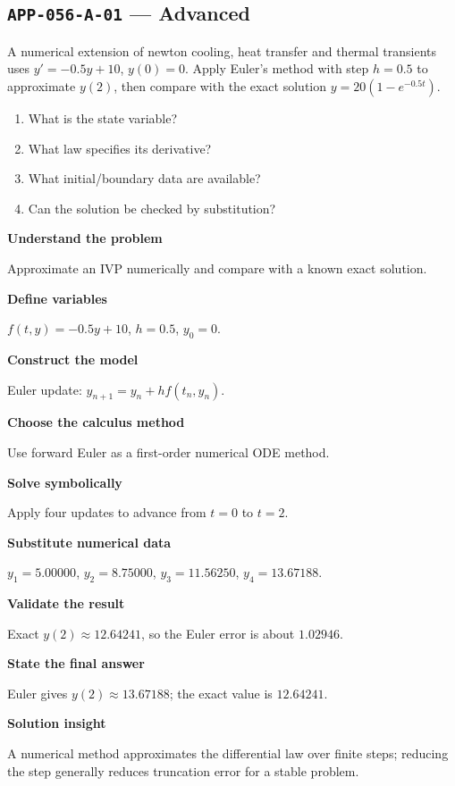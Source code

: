 \documentclass[11pt]{book}
\newcommand{\pid}[1]{\texttt{#1}}
\begin{document}
\subsection*{\pid{APP-056-A-01} — Advanced}
\begin{problembox}
A numerical extension of newton cooling, heat transfer and thermal transients uses $y'=-0.5y+10$, $y(0)=0$. Apply Euler's method with step $h=0.5$ to approximate $y(2)$, then compare with the exact solution $y=20(1-e^{-0.5t})$.
\end{problembox}
\begin{promptbox}\begin{enumerate}
\item What is the state variable?
\item What law specifies its derivative?
\item What initial/boundary data are available?
\item Can the solution be checked by substitution?
\end{enumerate}\end{promptbox}
\begin{solutionbox}
\textbf{Understand the problem}\par Approximate an IVP numerically and compare with a known exact solution.\par\medskip
\textbf{Define variables}\par $f(t,y)=-0.5y+10$, $h=0.5$, $y_0=0$.\par\medskip
\textbf{Construct the model}\par Euler update: $y_{n+1}=y_n+h f(t_n,y_n)$.\par\medskip
\textbf{Choose the calculus method}\par Use forward Euler as a first-order numerical ODE method.\par\medskip
\textbf{Solve symbolically}\par Apply four updates to advance from $t=0$ to $t=2$.\par\medskip
\textbf{Substitute numerical data}\par $y_1=5.00000$, $y_2=8.75000$, $y_3=11.56250$, $y_4=13.67188$.\par\medskip
\textbf{Validate the result}\par Exact $y(2)\approx 12.64241$, so the Euler error is about $1.02946$.\par\medskip
\textbf{State the final answer}\par Euler gives $y(2)\approx 13.67188$; the exact value is $12.64241$.\par\medskip
\textbf{Solution insight}\par A numerical method approximates the differential law over finite steps; reducing the step generally reduces truncation error for a stable problem.\par\medskip
\end{solutionbox}
\end{document}
